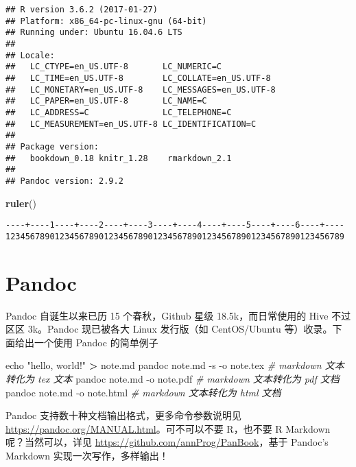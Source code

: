 \documentclass[
  cn,11pt,chinese,bibstyle=apalike]{elegantbook}
\newenvironment{Shaded}{\begin{snugshade}}{\end{snugshade}}
\newcommand{\BuiltInTok}[1]{#1}
\newcommand{\CommentTok}[1]{\textcolor[rgb]{0.56,0.35,0.01}{\textit{#1}}}
\newcommand{\ExtensionTok}[1]{#1}
\newcommand{\KeywordTok}[1]{\textcolor[rgb]{0.13,0.29,0.53}{\textbf{#1}}}
\newcommand{\NormalTok}[1]{#1}
\newcommand{\OperatorTok}[1]{\textcolor[rgb]{0.81,0.36,0.00}{\textbf{#1}}}
\newcommand{\StringTok}[1]{\textcolor[rgb]{0.31,0.60,0.02}{#1}}
\begin{document}
\begin{verbatim}
## R version 3.6.2 (2017-01-27)
## Platform: x86_64-pc-linux-gnu (64-bit)
## Running under: Ubuntu 16.04.6 LTS
## 
## Locale:
##   LC_CTYPE=en_US.UTF-8       LC_NUMERIC=C              
##   LC_TIME=en_US.UTF-8        LC_COLLATE=en_US.UTF-8    
##   LC_MONETARY=en_US.UTF-8    LC_MESSAGES=en_US.UTF-8   
##   LC_PAPER=en_US.UTF-8       LC_NAME=C                 
##   LC_ADDRESS=C               LC_TELEPHONE=C            
##   LC_MEASUREMENT=en_US.UTF-8 LC_IDENTIFICATION=C       
## 
## Package version:
##   bookdown_0.18 knitr_1.28    rmarkdown_2.1
## 
## Pandoc version: 2.9.2
\end{verbatim}

\begin{Shaded}
\begin{Highlighting}[]
\KeywordTok{ruler}\NormalTok{()}
\end{Highlighting}
\end{Shaded}

\begin{verbatim}
----+----1----+----2----+----3----+----4----+----5----+----6----+----
123456789012345678901234567890123456789012345678901234567890123456789
\end{verbatim}

\hypertarget{pandoc}{%
\section{Pandoc}\label{pandoc}}

Pandoc 自诞生以来已历 15 个春秋，Github 星级 18.5k，而日常使用的 Hive 不过区区 3k。Pandoc 现已被各大 Linux 发行版（如 CentOS/Ubuntu 等）收录。下面给出一个使用 Pandoc 的简单例子

\begin{Shaded}
\begin{Highlighting}[]
\BuiltInTok{echo} \StringTok{"hello, world!"} \OperatorTok{\textgreater{}}\NormalTok{ note.md}
\ExtensionTok{pandoc}\NormalTok{ note.md {-}s {-}o note.tex }\CommentTok{\# markdown 文本转化为 tex 文本}
\ExtensionTok{pandoc}\NormalTok{ note.md {-}o note.pdf    }\CommentTok{\# markdown 文本转化为 pdf 文档}
\ExtensionTok{pandoc}\NormalTok{ note.md {-}o note.html   }\CommentTok{\# markdown 文本转化为 html 文档}
\end{Highlighting}
\end{Shaded}

Pandoc 支持数十种文档输出格式，更多命令参数说明见 \url{https://pandoc.org/MANUAL.html}。可不可以不要 R，也不要 R Markdown 呢？当然可以，详见 \url{https://github.com/annProg/PanBook}，基于 Pandoc's Markdown 实现一次写作，多样输出！
\end{document}
